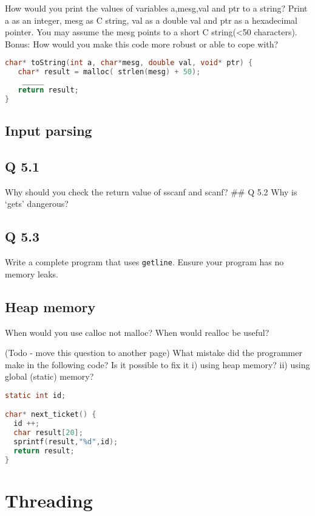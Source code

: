 How would you print the values of variables a,mesg,val and ptr to a string? Print a as an integer, mesg as C string, val as a double val and ptr as a hexadecimal pointer. You may assume the mesg points to a short C string(\textless{}50 characters). Bonus: How would you make this code more robust or able to cope with?

\begin{lstlisting}[language=C]
char* toString(int a, char*mesg, double val, void* ptr) {
   char* result = malloc( strlen(mesg) + 50);
    _____
   return result;
}
\end{lstlisting}

\subsection{Input parsing}\label{input-parsing}

\subsection{Q 5.1}\label{q-5.1}

Why should you check the return value of sscanf and scanf? \#\# Q 5.2 Why is `gets' dangerous?

\subsection{Q 5.3}\label{q-5.3}

Write a complete program that uses \texttt{getline}. Ensure your program has no memory leaks.

\subsection{Heap memory}\label{heap-memory}

When would you use calloc not malloc? When would realloc be useful?

(Todo - move this question to another page) What mistake did the programmer make in the following code? Is it possible to fix it i) using heap memory? ii) using global (static) memory?

\begin{lstlisting}[language=C]
static int id;

char* next_ticket() {
  id ++;
  char result[20];
  sprintf(result,"%d",id);
  return result;
}
\end{lstlisting}

\section{Threading}

